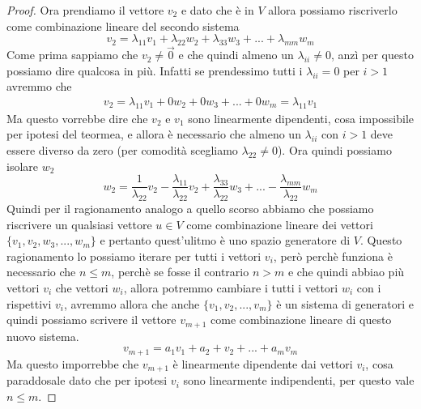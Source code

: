 \documentclass{rapport}
\begin{document}
\begin{proof}
  Ora prendiamo il vettore $v_2$ e dato che è in $V$ allora possiamo riscriverlo come combinazione lineare del secondo sistema
  \[
  v_2 = \lambda_{11} v_1 +  \lambda_{22} w_2 +  \lambda_{33} w_3 + ... + \lambda_{mm} w_m  
  \]
  Come prima sappiamo che $v_2 \ne \vec{0}$ e che quindi almeno un $\lambda_{ii} \ne 0$, anzì per questo possiamo dire qualcosa in più. Infatti se prendessimo tutti i $\lambda_{ii}=0$ per $i> 1$ avremmo che 
\begin{align*}
  v_2 = \lambda_{11} v_1 +  0 w_2 + 0 w_3 + ... + 0 w_m   = \lambda_{11} v_1
\end{align*}
Ma questo vorrebbe dire che $v_2$ e $v_1$ sono linearmente dipendenti, cosa impossibile per ipotesi del teormea, e allora è necessario che almeno un $\lambda_{ii}$ con $i>1$ deve essere diverso da zero (per comodità scegliamo $\lambda_{22}\ne 0$). Ora quindi possiamo isolare $w_2$
 \[
  w_2 =\dfrac{1}{\lambda_{22}} v_2 - \dfrac{\lambda_{11}}{\lambda_{22}}v_2 +\dfrac{\lambda_{33}}{\lambda_{22}}w_3 +  ... - \dfrac{\lambda_{mm}}{\lambda_{22}}w_{m} 
  \]
  Quindi per il ragionamento analogo a quello scorso abbiamo che possiamo riscrivere un qualsiasi vettore $u\in V$ come combinazione lineare dei vettori $\{v_1,v_2,w_3, ..., w_m\}$ e pertanto quest'ulitmo è uno spazio generatore di $V$. Questo ragionamento lo possiamo iterare per tutti i vettori $v_{i}$, però perchè funziona è necessario che $n\leq m$, perchè se fosse il contrario $n > m$ e che quindi abbiao più vettori $v_i$ che vettori $w_i$, allora potremmo cambiare i tutti i vettori $w_i$ con i rispettivi $v_i$, avremmo allora che anche $\{v_1, v_2, ..., v_m\}$ è un sistema di generatori e quindi possiamo scrivere il vettore $v_{m+1}$ come combinazione lineare di questo nuovo sistema. 
  \[
  v_{m+1} = a_1v_1 +a_2+v_2+ ... + a_mv_m
  \]
  Ma questo imporrebbe che $v_{m+1}$ è linearmente dipendente dai vettori $v_i$, cosa paraddosale dato che per ipotesi $v_i$ sono linearmente indipendenti, per questo vale $n \leq m$. 
\end{proof}
\end{document}
